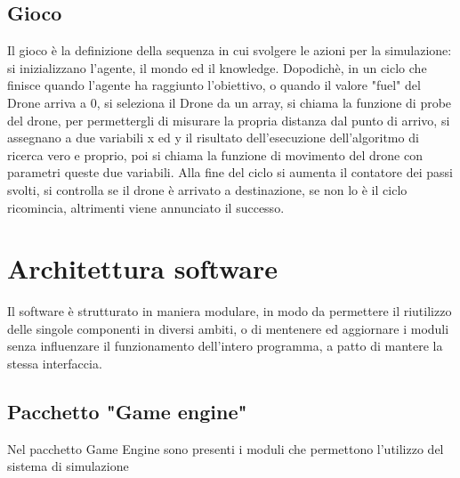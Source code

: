 \subsection{Gioco}
Il gioco è la definizione della sequenza in cui svolgere le azioni per la simulazione: si inizializzano l'agente, il mondo ed il knowledge. Dopodichè, in un ciclo che finisce quando l'agente ha raggiunto l'obiettivo, o quando il valore "fuel" del Drone arriva a 0, si seleziona il Drone da un array, si chiama la funzione di probe del drone, per permettergli di misurare la propria distanza dal punto di arrivo, si assegnano a due variabili x ed y il risultato dell'esecuzione dell'algoritmo di ricerca vero e proprio, poi si chiama la funzione di movimento del drone con parametri queste due variabili. Alla fine del ciclo si aumenta il contatore dei passi svolti, si controlla se il drone è arrivato a destinazione, se non lo è il ciclo ricomincia, altrimenti viene annunciato il successo.

	
\section{Architettura software}
Il software è strutturato in maniera modulare, in modo da permettere il riutilizzo delle singole componenti in diversi ambiti, o di mentenere ed aggiornare i moduli senza influenzare il funzionamento dell'intero programma, a patto di mantere la stessa interfaccia.

\subsection{Pacchetto "Game engine"}
Nel pacchetto Game Engine sono presenti i moduli che permettono l'utilizzo del sistema di simulazione

